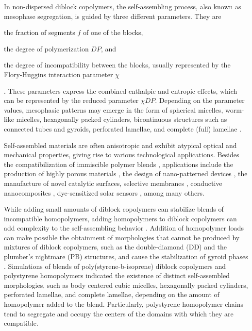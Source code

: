 \documentclass[
aip,
jcp,
reprint,
]{revtex4-1}
\begin{document}
In non-dispersed diblock copolymers, the self-assembling process, also known as mesophase segregation, is guided by three different parameters.
They are \begin{enumerate*}[label=(\roman*)] \item the fraction of segments $f$ of one of the blocks, \item the degree of polymerization $DP$, and \item the degree of incompatibility between the blocks, usually represented by the Flory-Huggins interaction parameter $\chi$ \end{enumerate*} \cite{Bates_1990}.
These parameters express the combined enthalpic and entropic effects, which can be represented by the reduced parameter $\chi DP$.
Depending on the parameter values, mesophasic patterns may emerge in the form of spherical micelles, worm-like micelles, hexagonally packed cylinders, bicontinuous structures such as connected tubes and gyroids, perforated lamellae, and complete (full) lamellae \cite{Leibler_1980}.

Self-assembled materials are often anisotropic and exhibit atypical optical and mechanical properties, giving rise to various technological applications.
Besides the compatibilization of immiscible polymer blends \cite{Utracki_2002}, applications include the production of highly porous materials \cite{Uehara_2006, Kamperman_2004}, the design of nano-patterned devices \cite{Li_2006}, the manufacture of novel catalytic surfaces, selective membranes \cite{Yu_2015}, conductive nanocomposites \cite{Cho_2004}, dye-sensitized solar sensors \cite{Sun_2003, Watkins_2005}, among many others.

While adding small amounts of diblock copolymers can stabilize blends of incompatible homopolymers, adding homopolymers to diblock copolymers can add complexity to the self-assembling behavior \cite{Soto-Figueroa_2007}.
Addition of homopolymer loads can make possible the obtainment of morphologies that cannot be produced by mixtures of diblock copolymers, such as the double-diamond (DD) and the plumber's nightmare (PB) structures, and cause the stabilization of gyroid phases \cite{Martinez-Veracoechea_2009}.
Simulations of blends of poly(styrene-b-isoprene) diblock copolymers and polystyrene homopolymers \cite{Soto-Figueroa_2007} indicated the existence of distinct self-assembled morphologies, such as body centered cubic micelles, hexagonally packed cylinders, perforated lamellae, and complete lamellae, depending on the amount of homopolymer added to the blend.
Particularly, polystyrene homopolymer chains tend to segregate and occupy the centers of the domains with which they are compatible. \cite{Soto-Figueroa_2007}
\end{document}
